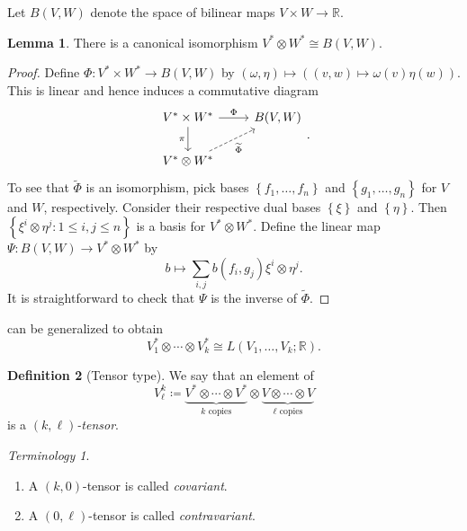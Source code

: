 \documentclass[10pt,letterpaper,cm]{nupset}
\theoremstyle{definition}
\newtheorem{definition}{Definition}[subsection]
\theoremstyle{theorem}
\newtheorem{lemma}[definition]{Lemma}
\theoremstyle{remark}
\newtheorem*{term}{Terminology}
\newcommand{\R}{\mathbb R}
\newcommand{\1}{\mathbf{1}}
\newcommand{\0}{\vec 0}
\begin{document}
\smallskip


Let $B(V, W)$ denote the space of bilinear maps $V \times W \to \R$.

\begin{lemma}\label{isom}
There is a canonical isomorphism $V^{\ast} \otimes W^{\ast} \cong B(V, W)$. 
\end{lemma}
\begin{proof}
Define $\Phi : V^{\ast} \times W^{\ast} \to B(V, W)$ by $\left(\omega, \eta\right) \mapsto \left((v, w) \mapsto \omega(v) \eta(w)\right)$.
This is linear and hence induces a commutative diagram
\[
\begin{tikzcd}
V^{\ast}\times W^{\ast} \arrow[d, "\pi"'] \arrow[r, "\Phi"] & {B(V, W)} \\
V^{\ast} \otimes W^{\ast} \arrow[ru, "{\widetilde{\Phi}}"', dashed] & 
\end{tikzcd} .
\]
To see that  $\tilde{\Phi}$ is an isomorphism, pick bases $\left\{f_1, \ldots, f_n\right\}$ and $\left\{g_1, \ldots, g_n\right\}$ for $V$ and $W$, respectively. Consider their respective dual bases $\left\{\xi\right\}$ and $\left\{\eta\right\}$. Then $\left\{\xi^i \otimes \eta^j :1 \leq i,j\leq n\right\}$ is a basis for $V^{\ast} \otimes W^{\ast}$. Define the linear map $\Psi : B(V, W) \to V^{\ast} \otimes W^{\ast}$ by 
\[
b \mapsto \sum_{i,j}b(f_i, g_j)\xi^i \otimes \eta^j
.\]  It is straightforward to check that $\Psi$ is the inverse of $\tilde{\Phi}$.
\end{proof}

 can be generalized to obtain $$V_1^{\ast} \otimes \cdots \otimes V_k^{\ast} \cong L(V_1, \ldots, V_k; \R). $$

\begin{definition}[Tensor type]
We say that an element of $$V_{\ell}^k\coloneqq  \underbrace{V^{\ast} \otimes \cdots \otimes V^{\ast}}_{k \text{ copies}} \otimes \underbrace{V \otimes \cdots \otimes V}_{\ell \text{ copies}}$$ is a \textit{$(k, \ell)$-tensor}. 
\end{definition}

\begin{term} $ $
\begin{enumerate}
\item A $(k, 0)$-tensor is called \textit{covariant}. 
\item A $(0, \ell)$-tensor is called \textit{contravariant}.
\end{enumerate}
\end{term}

\smallskip
\end{document}
